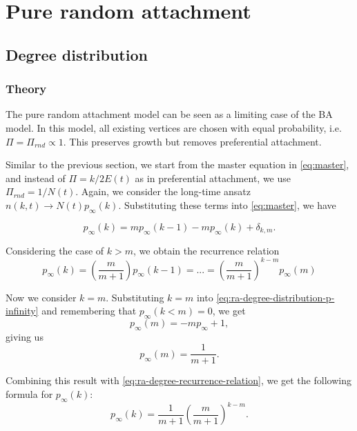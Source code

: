 \section{Pure random attachment}\label{section:pure-random-attachment}

\subsection{Degree distribution}
\subsubsection{Theory}
The pure random attachment model can be seen as a limiting case of the BA model. In this model, all existing vertices are chosen with equal probability, i.e. $\Pi = \Pi_{rnd} \propto 1$. This preserves growth but removes preferential attachment. 

Similar to the previous section, we start from the master equation in \autoref{eq:master}, and instead of $\Pi = k/ 2E(t)$ as in preferential attachment, we use $\Pi_{rnd} = 1 / N(t)$. Again, we consider the long-time ansatz $n(k, t) \rightarrow N(t) p_{\infty}(k)$. Substituting these terms into \autoref{eq:master}, we have

\begin{equation}
	p_{\infty}(k) = m p_{\infty}(k-1) - m p_{\infty}(k) + \delta_{k, m}. 
	\label{eq:ra-degree-distribution-p-infinity}
\end{equation}

Considering the case of $k > m$, we obtain the recurrence relation
\begin{equation}
	p_{\infty}(k) = \left ( \frac{m}{m+1} \right ) p_{\infty}(k-1)=...= \left ( \frac{m}{m+1} \right )^{k-m} p_{\infty}(m)
	\label{eq:ra-degree-recurrence-relation}
\end{equation}

Now we consider $k=m$. Substituting $k=m$ into \autoref{eq:ra-degree-distribution-p-infinity} and remembering that $p_{\infty}(k < m) = 0$, we get
\begin{equation}
	p_{\infty}(m) = -mp_{\infty} + 1, 
	\label{eq:ra-degree-k-equal-m}
\end{equation}
giving us 
\begin{equation}
	p_{\infty}(m) = \frac{1}{m+1}. 
	\label{eq:ra-degree-p-infinity-m}
\end{equation}

Combining this result with \autoref{eq:ra-degree-recurrence-relation}, we get the following formula for $p_{\infty}(k)$:
\begin{equation}
	p_{\infty}(k) = \frac{1}{m+1} \left ( \frac{m}{m+1}\right )^{k-m}.
	\label{eq:p-infinity-solution-ra}
\end{equation}

